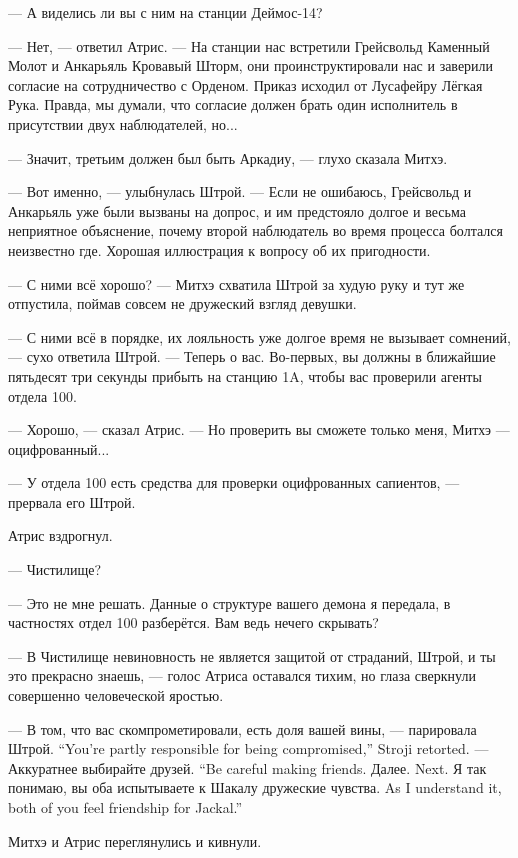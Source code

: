 --- А виделись ли вы с ним на станции Деймос-14?

--- Нет, --- ответил Атрис.
--- На станции нас встретили Грейсвольд Каменный Молот и Анкарьяль Кровавый Шторм, они проинструктировали нас и заверили согласие на сотрудничество с Орденом.
Приказ исходил от Лусафейру Лёгкая Рука.
Правда, мы думали, что согласие должен брать один исполнитель в присутствии двух наблюдателей, но...

--- Значит, третьим должен был быть Аркадиу, --- глухо сказала Митхэ.

--- Вот именно, --- улыбнулась Штрой.
--- Если не ошибаюсь, Грейсвольд и Анкарьяль уже были вызваны на допрос, и им предстояло долгое и весьма неприятное объяснение, почему второй наблюдатель во время процесса болтался неизвестно где.
Хорошая иллюстрация к вопросу об их пригодности.

--- С ними всё хорошо? --- Митхэ схватила Штрой за худую руку и тут же отпустила, поймав совсем не дружеский взгляд девушки.

--- С ними всё в порядке, их лояльность уже долгое время не вызывает сомнений, --- сухо ответила Штрой.
--- Теперь о вас.
Во-первых, вы должны в ближайшие пятьдесят три секунды прибыть на станцию 1A, чтобы вас проверили агенты отдела 100.

--- Хорошо, --- сказал Атрис.
--- Но проверить вы сможете только меня, Митхэ --- оцифрованный...

--- У отдела 100 есть средства для проверки оцифрованных сапиентов, --- прервала его Штрой.

Атрис вздрогнул.

--- Чистилище?

--- Это не мне решать.
Данные о структуре вашего демона я передала, в частностях отдел 100 разберётся.
Вам ведь нечего скрывать?

--- В Чистилище невиновность не является защитой от страданий, Штрой, и ты это прекрасно знаешь, --- голос Атриса оставался тихим, но глаза сверкнули совершенно человеческой яростью.

{--- В том, что вас скомпрометировали, есть доля вашей вины, --- парировала Штрой.}
{``You're partly responsible for being compromised,'' Stroji retorted.}
{--- Аккуратнее выбирайте друзей.}
{``Be careful making friends.}
{Далее.}
{Next.}
{Я так понимаю, вы оба испытываете к Шакалу дружеские чувства.}
{As I understand it, both of you feel friendship for Jackal.''}

Митхэ и Атрис переглянулись и кивнули.

